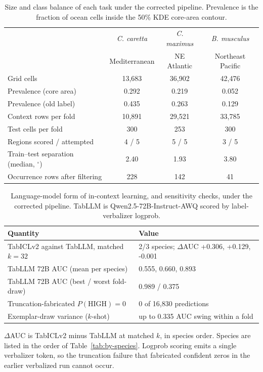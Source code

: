 \begin{table}[t]
\centering
\caption{Size and class balance of each task under the corrected pipeline. Prevalence is the fraction of ocean cells inside the 50\% KDE core-area contour.}
\label{tab:task-scale}
\begin{tabular}{lccc}
\toprule
 & \emph{C. caretta} & \emph{C. maximus} & \emph{B. musculus} \\
 & Mediterranean & NE Atlantic & Northeast Pacific \\
\midrule
Grid cells & 13,683 & 36,902 & 42,476 \\
Prevalence (core area) & 0.292 & 0.219 & 0.052 \\
Prevalence (old label) & 0.435 & 0.263 & 0.129 \\
Context rows per fold & 10,891 & 29,521 & 33,785 \\
Test cells per fold & 300 & 253 & 300 \\
Regions scored / attempted & 4 / 5 & 5 / 5 & 3 / 5 \\
Train--test separation (median, $^\circ$) & 2.40 & 1.93 & 3.80 \\
Occurrence rows after filtering & 228 & 142 & 41 \\
\bottomrule
\end{tabular}
\end{table}

\begin{table}[t]
\centering
\caption{Language-model form of in-context learning, and sensitivity checks, under the corrected pipeline. TabLLM is Qwen2.5-72B-Instruct-AWQ scored by label-verbalizer logprob.}
\label{tab:tabllm}
\begin{tabular}{ll}
\toprule
Quantity & Value \\
\midrule
TabICLv2 against TabLLM, matched $k=32$ & 2/3 species; $\Delta$AUC +0.306, +0.129, -0.001 \\
TabLLM 72B AUC (mean per species) & 0.555, 0.660, 0.893 \\
TabLLM 72B AUC (best / worst fold-draw) & 0.989 / 0.375 \\
Truncation-fabricated $P(\text{HIGH})=0$ & 0 of 16,830 predictions \\
Exemplar-draw variance ($k$-shot) & up to 0.335 AUC swing within a fold \\
\bottomrule
\end{tabular}
\begin{minipage}{\linewidth}\footnotesize $\Delta$AUC is TabICLv2 minus TabLLM at matched $k$, in species order. Species are listed in the order of Table~\ref{tab:by-species}. Logprob scoring emits a single verbalizer token, so the truncation failure that fabricated confident zeros in the earlier verbalized run cannot occur.\end{minipage}
\end{table}

